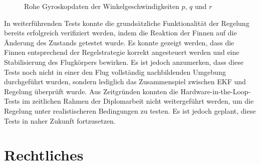 \begin{figure}[H]
    \vspace{-0.5cm}
    \centering
    \caption{Rohe Gyroskopdaten der Winkelgeschwindigkeiten $p$, $q$ und $r$}
    \label{fig:winkelverlauf_csv32}
    \vspace{-0.5cm}
\end{figure}
In weiterführenden Tests konnte die grundsätzliche Funktionalität der Regelung bereits erfolgreich verifiziert werden, indem die Reaktion der Finnen auf die Änderung des Zustands getestet wurde. Es konnte gezeigt werden, dass die Finnen entsprechend der Regelstrategie korrekt angesteuert werden und eine Stabilisierung des Flugkörpers bewirken. Es ist jedoch anzumerken, dass diese Tests noch nicht in einer den Flug vollständig nachbildenden Umgebung durchgeführt wurden, sondern lediglich das Zusammenspiel zwischen EKF und Regelung überprüft wurde.
Aus Zeitgründen konnten die Hardware-in-the-Loop-Tests im zeitlichen Rahmen der Diplomarbeit nicht weitergeführt werden, um die Regelung unter realistischeren Bedingungen zu testen. Es ist jedoch geplant, diese Tests in naher Zukunft fortzusetzen.

\chapter{Rechtliches}
\label{ch:legal}

